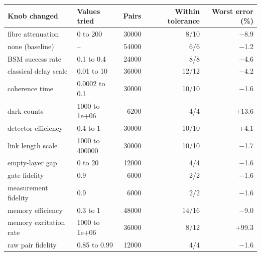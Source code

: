 \begin{tabular}{llrrr}
\toprule
Knob changed & Values tried & Pairs & Within tolerance & Worst error (\%) \\
\midrule
fibre attenuation & 0 to 200 & 30000 & 8/10 & $-$8.9 \\
none (baseline) & -- & 54000 & 6/6 & $-$1.2 \\
BSM success rate & 0.1 to 0.4 & 24000 & 8/8 & $-$4.6 \\
classical delay scale & 0.01 to 10 & 36000 & 12/12 & $-$4.2 \\
coherence time & 0.0002 to 0.1 & 30000 & 10/10 & $-$1.6 \\
dark counts & 1000 to 1e+06 & 6200 & 4/4 & +13.6 \\
detector efficiency & 0.4 to 1 & 30000 & 10/10 & +4.1 \\
link length scale & 1000 to 400000 & 30000 & 10/10 & $-$1.7 \\
empty-layer gap & 0 to 20 & 12000 & 4/4 & $-$1.6 \\
gate fidelity & 0.9 & 6000 & 2/2 & $-$1.6 \\
measurement fidelity & 0.9 & 6000 & 2/2 & $-$1.6 \\
memory efficiency & 0.3 to 1 & 48000 & 14/16 & $-$9.0 \\
memory excitation rate & 1000 to 1e+06 & 36000 & 8/12 & +99.3 \\
raw pair fidelity & 0.85 to 0.99 & 12000 & 4/4 & $-$1.6 \\
\bottomrule
\end{tabular}
